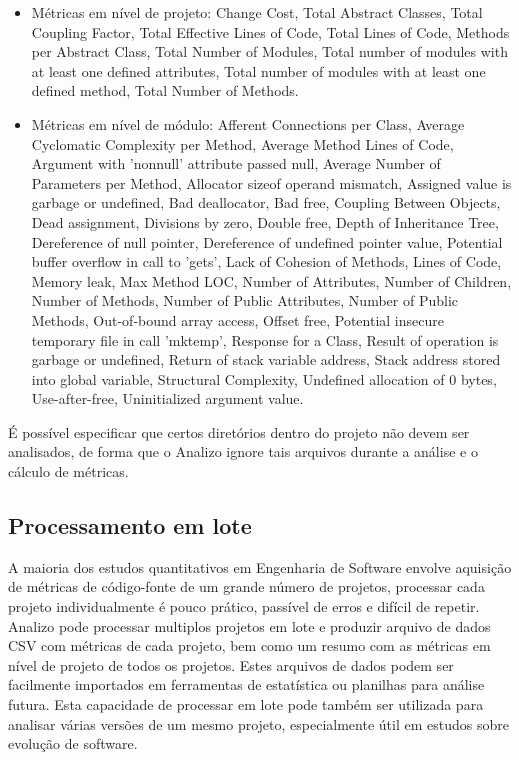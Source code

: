 \begin{itemize}

  \item Métricas em nível de projeto: Change Cost, Total Abstract Classes,
  Total Coupling Factor, Total Effective Lines of Code, Total Lines of Code,
  Methods per Abstract Class, Total Number of Modules, Total number of modules
  with at least one defined attributes, Total number of modules with at least
  one defined method, Total Number of Methods.

  \item Métricas em nível de módulo: Afferent Connections per Class, Average
  Cyclomatic Complexity per Method, Average Method Lines of Code, Argument with
  'nonnull' attribute passed null, Average Number of Parameters per Method,
  Allocator sizeof operand mismatch, Assigned value is garbage or undefined,
  Bad deallocator, Bad free, Coupling Between Objects, Dead assignment,
  Divisions by zero, Double free, Depth of Inheritance Tree, Dereference of
  null pointer, Dereference of undefined pointer value, Potential buffer
  overflow in call to 'gets', Lack of Cohesion of Methods, Lines of Code,
  Memory leak, Max Method LOC, Number of Attributes, Number of Children, Number
  of Methods, Number of Public Attributes, Number of Public Methods,
  Out-of-bound array access, Offset free, Potential insecure temporary file in
  call 'mktemp', Response for a Class, Result of operation is garbage or
  undefined, Return of stack variable address, Stack address stored into global
  variable, Structural Complexity, Undefined allocation of 0 bytes,
  Use-after-free, Uninitialized argument value.

\end{itemize}

É possível especificar que certos diretórios dentro do projeto não devem ser
analisados, de forma que o Analizo ignore tais arquivos durante a análise e o
cálculo de métricas.

\subsection{Processamento em lote}\label{lote}

A maioria dos estudos quantitativos em Engenharia de Software envolve aquisição
de métricas de código-fonte de um grande número de projetos, processar cada
projeto individualmente é pouco prático, passível de erros e difícil de
repetir. Analizo pode processar multiplos projetos em lote e produzir arquivo
de dados CSV com métricas de cada projeto, bem como um resumo com as métricas
em nível de projeto de todos os projetos. Estes arquivos de dados podem ser
facilmente importados em ferramentas de estatística ou planilhas para análise
futura. Esta capacidade de processar em lote pode também ser utilizada para
analisar várias versões de um mesmo projeto, especialmente útil em estudos
sobre evolução de software.

